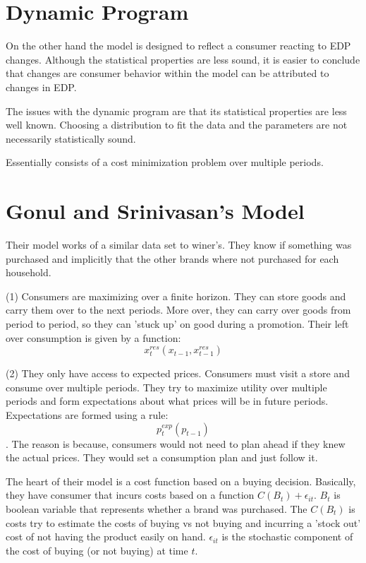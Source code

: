 \documentclass{article}
\begin{document}
\section{Dynamic Program}

On the other hand the model is designed to reflect a consumer reacting to EDP changes. Although the statistical properties are less sound, it is easier to conclude that changes are consumer behavior within the model can be attributed to changes in EDP.

The issues with the dynamic program are that its statistical properties are less well known. Choosing a distribution to fit the data and the parameters are not necessarily statistically sound.

Essentially consists of a cost minimization problem over multiple periods.



\section{Gonul and Srinivasan's Model}

Their model works of a similar data set to winer's. They know if something was purchased and implicitly that the other brands where not purchased for each household.

(1) Consumers are maximizing over a finite horizon. They can store goods and carry them over to the next periods. More over, they can carry over goods from period to period, so they can 'stuck up' on good during a promotion. Their left over consumption is given by a function: $$x^{res}_t(x_{t-1},x^{res}_{t-1})$$

(2) They only have access to expected prices. Consumers must visit a store and consume over multiple periods. They try to maximize utility over multiple periods and form expectations about what prices will be in future periods. Expectations are formed using a rule: $$p^{exp}_t(p_{t-1})$$. The reason is because, consumers would not need to plan ahead if they knew the actual prices. They would set a consumption plan and just follow it.

The heart of their model is a cost function based on a buying decision. Basically, they have consumer that incurs costs based on a function $C(B_t) + \epsilon_{it}$. $B_t$ is boolean variable that represents whether a brand was purchased. The $C(B_t)$ is costs try to estimate the costs of buying vs not buying and incurring a 'stock out' cost of not having the product easily on hand. $\epsilon_{it}$ is the stochastic component of the cost of buying (or not buying)
at time $t$.
\end{document}
